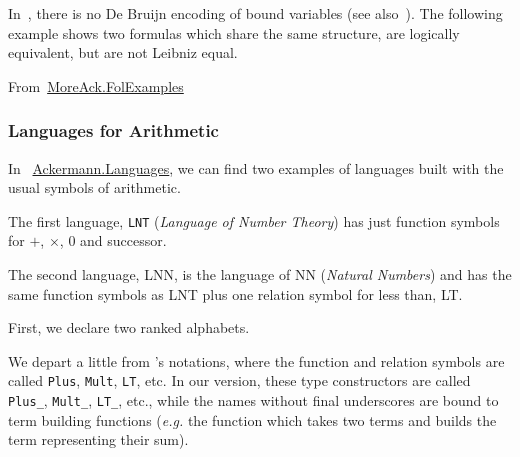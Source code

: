 \vspace{6pt}



\begin{remark}

  In~\cite{Goedel}, there is no De Bruijn encoding of bound variables (see also~\cite{OConnor05}). The following example shows two formulas which share the same structure, are logically equivalent, but are not Leibniz equal.

\vspace{4pt}

\noindent From~\href{../theories/html/hydras.MoreAck.FolExamples.html}{MoreAck.FolExamples}
  
\end{remark}




\subsubsection{Languages for Arithmetic}






In ~\href{../theories/html/hydras.Ackermann.Languages.html}{Ackermann.Languages}, we can find two examples of languages built with the usual symbols of arithmetic.

The first language, \texttt{LNT} (\emph{Language of Number Theory}) has just function symbols for $+$, $\times$, $0$ and successor.




The second language, LNN, is the language of NN (\emph{Natural Numbers}) and has
the same function symbols as LNT plus one relation symbol for less than, LT.

First, we declare two ranked alphabets.

\begin{remark}
  We depart a little from \cite{Goedel}'s notations, where the 
function and relation symbols are called \texttt{Plus}, 
\texttt{Mult}, \texttt{LT}, etc. In our version, these type constructors are called \texttt{Plus\_}, 
\texttt{Mult\_}, \texttt{LT\_}, etc., while the names without final underscores are bound to term building functions (\emph{e.g.}
the function which takes two terms and builds the term representing their sum).
\end{remark}




